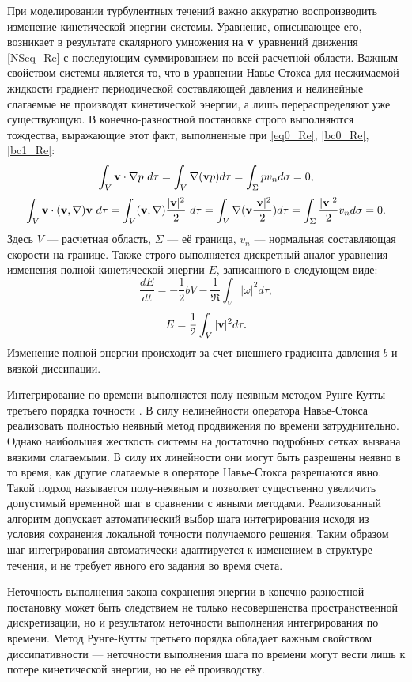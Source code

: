 При моделировании турбулентных течений важно аккуратно воспроизводить изменение кинетической энергии системы. Уравнение, описывающее его, возникает в результате скалярного умножения на $\mathbf{v}$ уравнений движения \eqref{NSeq_Re} с последующим суммированием по всей расчетной области. Важным свойством системы является то, что в уравнении Навье-Стокса для несжимаемой жидкости градиент периодической составляющей давления и нелинейные слагаемые не производят кинетической энергии, а лишь перераспределяют уже существующую. В конечно-разностной постановке строго выполняются тождества, выражающие этот факт, выполненные при \eqref{eq0_Re}, \eqref{bc0_Re}, \eqref{bc1_Re}:
$$
\int_V \mathbf{v} \cdot \nabla p\ d\tau= \int_V \nabla (\mathbf{v} p) d\tau = \int_{\Sigma} p v_n d\sigma = 0, 
$$
$$
\int_V \mathbf{v} \cdot (\mathbf{v}, \nabla) \mathbf{v}\ d\tau = \int_V (\mathbf{v}, \nabla)\frac{|\mathbf{v}|^2}{2}\ d\tau = \int_V \nabla (\mathbf{v} \frac{|\mathbf{v}|^2}{2}) d\tau = \int_{\Sigma} \frac{|\mathbf{v}|^2}{2} v_n d\sigma = 0.
$$
Здесь $V$ --- расчетная область, $\Sigma$ --- её граница, $v_n$ --- нормальная составляющая скорости на границе. Также строго выполняется дискретный аналог уравнения изменения полной кинетической энергии $E$, записанного в следующем виде:
\begin{equation} \label{Eeq}
\frac{d E}{d t} = - \frac{1}{2}bV - \frac{1}{\Re} \int_{V} |\omega|^2 d\tau,
\end{equation}
$$
E = \frac{1}{2}\int_{V} |\mathbf{v}|^2 d\tau.
$$
Изменение полной энергии происходит за счет внешнего градиента давления $b$ и вязкой диссипации. 

Интегрирование по времени выполняется полу-неявным методом Рунге-Кутты третьего порядка точности \cite{Nikitin2006third}. В силу нелинейности оператора Навье-Стокса реализовать полностью неявный метод продвижения по времени затруднительно. Однако наибольшая жесткость системы на достаточно подробных сетках вызвана вязкими слагаемыми. В силу их линейности они могут быть разрешены неявно в то время, как другие слагаемые в операторе Навье-Стокса разрешаются явно. Такой подход называется полу-неявным и позволяет существенно увеличить допустимый временной шаг в сравнении с явными методами. Реализованный алгоритм допускает автоматический выбор шага интегрирования исходя из условия сохранения локальной точности получаемого решения. Таким образом шаг интегрирования автоматически адаптируется к изменением в структуре течения, и не требует явного его задания во время счета. 

Неточность выполнения закона сохранения энергии в конечно-разностной постановку может быть следствием не только несовершенства пространственной дискретизации, но и результатом неточности выполнения интегрирования по времени. Метод Рунге-Кутты третьего порядка обладает важным свойством диссипативности --- неточности выполнения шага по времени могут вести лишь к потере кинетической энергии, но не её производству. 


